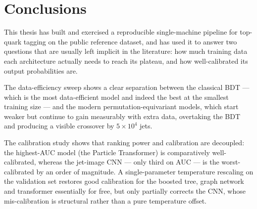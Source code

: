 \documentclass[12pt,a4paper,oneside]{report}
\begin{document}
\chapter{Conclusions}\label{ch:conclusions}

This thesis has built and exercised a reproducible single-machine
pipeline for top-quark tagging on the public reference dataset, and
has used it to answer two questions that are usually left implicit
in the literature: how much training data each architecture
actually needs to reach its plateau, and how well-calibrated its
output probabilities are.

The data-efficiency sweep shows a clear separation between the
classical BDT --- which is the most data-efficient model and indeed
the best at the smallest training size --- and the modern
permutation-equivariant models, which start weaker but continue to
gain measurably with extra data, overtaking the BDT and producing a
visible crossover by $5\times10^4$ jets.

The calibration study shows that ranking power and calibration are
decoupled: the highest-AUC model (the Particle Transformer) is
comparatively well-calibrated, whereas the jet-image CNN --- only
third on AUC --- is the worst-calibrated by an order of magnitude.
A single-parameter temperature rescaling on the validation set
restores good calibration for the boosted tree, graph network and
transformer essentially for free, but only partially corrects the
CNN, whose mis-calibration is structural rather than a pure
temperature offset.
\end{document}
